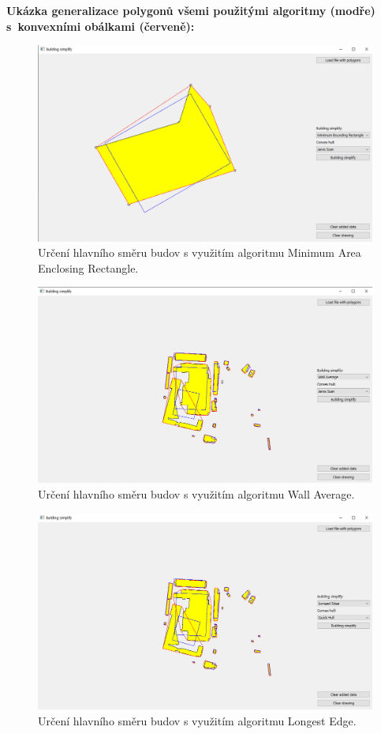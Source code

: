 \documentclass[a4paper, 12pt, oneside, titlepage]{article} %
\begin{document}
\textbf{Ukázka generalizace polygonů všemi použitými algoritmy (modře) s~konvexními obálkami (červeně):}
\begin{figure}[!htb]
	\centering
	\includegraphics[scale=0.5]{obrazky/maer.png} 
	\caption{Určení hlavního směru budov s využitím algoritmu Minimum Area Enclosing Rectangle.
	}
	\label{fig:maer}
\end{figure} 
\FloatBarrier

\begin{figure}[!htb]
	\centering
	\includegraphics[scale=0.5]{obrazky/wall_avr.png} 
	\caption{Určení hlavního směru budov s využitím algoritmu Wall Average.
	}
	\label{fig:wall_avr}
\end{figure} 
\FloatBarrier

\begin{figure}[!htb]
	\centering
	\includegraphics[scale=0.5]{obrazky/lon_edge.png} 
	\caption{Určení hlavního směru budov s využitím algoritmu Longest Edge.
	}
	\label{fig:lon_edge}
\end{figure} 
\FloatBarrier
\end{document}
